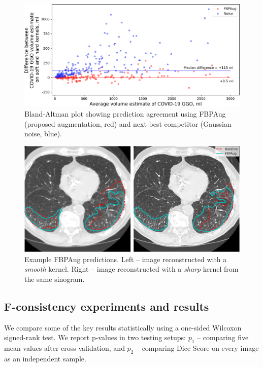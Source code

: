 \begin{figure}[h]
	\centering
	\includegraphics[width=\textwidth]{Dissertation/Figures/3_ct/bland-altman.png}
	\caption{Bland-Altman plot showing prediction agreement using FBPAug (proposed augmentation, red) and next best competitor (Gaussian noise, blue).}
	\label{fig:bland-altman}
\end{figure}

\begin{figure}[h]
	\centering
	\includegraphics[width=\textwidth]{Dissertation/Figures/3_ct/contours_new.png}
	\caption{Example FBPAug predictions. Left -- image reconstructed with a \textit{smooth} kernel. Right -- image reconstructed with a \textit{sharp} kernel from the same sinogram.}
	\label{fig:fbpaug_pred}
\end{figure}


\subsection{F-consistency experiments and results}

We compare some of the key results statistically using a one-sided Wilcoxon signed-rank test. We report p-values in two testing setups: $p_1$ -- comparing five mean values after cross-validation, and $p_2$ -- comparing Dice Score on every image as an independent sample.


